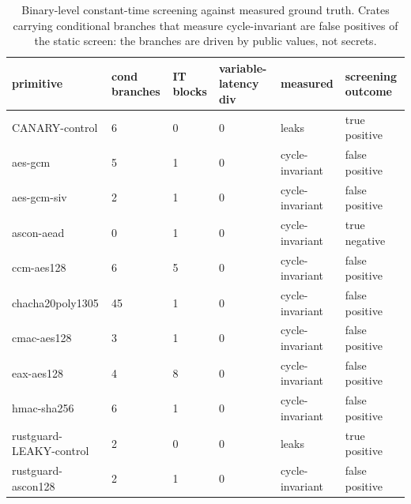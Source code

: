\begin{table}[t]
  \centering
  \caption{Binary-level constant-time screening against measured ground truth. Crates carrying conditional branches that measure cycle-invariant are false positives of the static screen: the branches are driven by public values, not secrets.}
  \label{tab:staticvsmeasured}
  \begin{tabular}{llllll}
    \toprule
    primitive & cond branches & IT blocks & variable-latency div & measured & screening outcome \\
    \midrule
    CANARY-control & 6 & 0 & 0 & leaks & true positive \\
    aes-gcm & 5 & 1 & 0 & cycle-invariant & false positive \\
    aes-gcm-siv & 2 & 1 & 0 & cycle-invariant & false positive \\
    ascon-aead & 0 & 1 & 0 & cycle-invariant & true negative \\
    ccm-aes128 & 6 & 5 & 0 & cycle-invariant & false positive \\
    chacha20poly1305 & 45 & 1 & 0 & cycle-invariant & false positive \\
    cmac-aes128 & 3 & 1 & 0 & cycle-invariant & false positive \\
    eax-aes128 & 4 & 8 & 0 & cycle-invariant & false positive \\
    hmac-sha256 & 6 & 1 & 0 & cycle-invariant & false positive \\
    rustguard-LEAKY-control & 2 & 0 & 0 & leaks & true positive \\
    rustguard-ascon128 & 2 & 1 & 0 & cycle-invariant & false positive \\
    \bottomrule
  \end{tabular}
\end{table}

